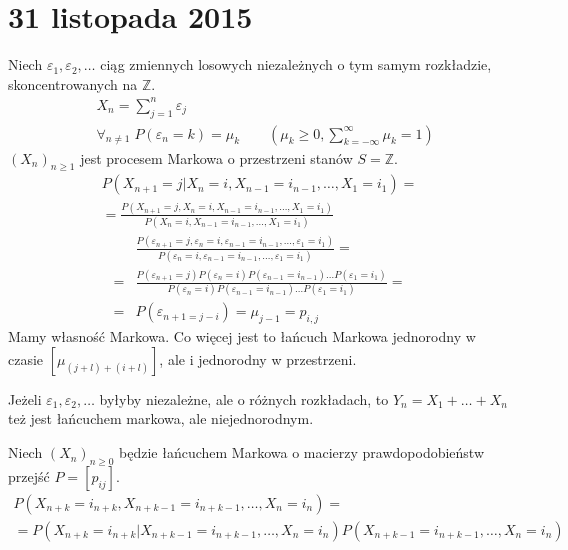 \chapter{31 listopada 2015}
\begin{prz}
Niech $ \varepsilon_1,\varepsilon_2,\dots  $ ciąg zmiennych losowych niezależnych o tym samym rozkładzie, skoncentrowanych na $ \mathbb Z $.
\begin{align*}
&X_n=\sum_{j=1}^{n}\varepsilon_j\\
&\forall_{n\neq 1}\;P(\varepsilon_n=k)=\mu_k\qquad
\left(\mu_k\ge 0,\sum_{k=-\infty }^{\infty }\mu_k=1\right)
\end{align*}
$ (X_n)_{n\ge 1} $ jest procesem Markowa o przestrzeni stanów $ S=\mathbb Z $.
\begin{gather*}
P\left(X_{n+1}=j|X_n=i,X_{n-1}=i_{n-1},\dots,X_1=i_1\right)
=\\=
\frac{P\left(X_{n+1}=j,X_n=i,X_{n-1}=i_{n-1},\dots,X_1=i_1\right)}{P\left(X_n=i,X_{n-1}=i_{n-1},\dots,X_1=i_1\right)}
\end{gather*}
\begin{align*}
&\frac{P\left(\varepsilon_{n+1}=j,\varepsilon_n=i,\varepsilon_{n-1}=i_{n-1},\dots,\varepsilon_1=i_1\right)}{P\left(\varepsilon_n=i,\varepsilon_{n-1}=i_{n-1},\dots,\varepsilon_1=i_1\right)}
=\\=&
\frac{P\left(\varepsilon_{n+1}=j\right )P\left (\varepsilon_n=i\right )P\left (\varepsilon_{n-1}=i_{n-1}\right )\dots P\left (\varepsilon_1=i_1\right)}{P\left(\varepsilon_n=i\right )P\left (\varepsilon_{n-1}=i_{n-1}\right )\dots P\left (\varepsilon_1=i_1\right)}
=\\=&
P\left(\varepsilon_{n+1=j-i}\right)=\mu_{j-1}=p_{i,j}
\end{align*}
Mamy własność Markowa. Co więcej jest to łańcuch Markowa jednorodny w czasie $ \left[\mu_{(j+l)+(i+l)}\right] $, ale i jednorodny w przestrzeni.

Jeżeli $ \varepsilon_1,\varepsilon_2,\dots  $ byłyby niezależne, ale o różnych rozkładach, to $ Y_n=X_1+\dots +X_n $ też jest łańcuchem markowa, ale niejednorodnym.
\end{prz}
\begin{twr}
Niech $ (X_n)_{n\ge 0} $ będzie łańcuchem Markowa o macierzy prawdopodobieństw przejść $ P=[p_{ij}] $.
\begin{gather*}
P\left(X_{n+k}=i_{n+k},X_{n+k-1}=i_{n+k-1},\dots,X_n=i_n\right)
=\\=
P\left(X_{n+k}=i_{n+k}|X_{n+k-1}=i_{n+k-1},\dots,X_n=i_n\right)
P\left(X_{n+k-1}=i_{n+k-1},\dots,X_n=i_n\right)
\end{gather*}
\end{twr}
